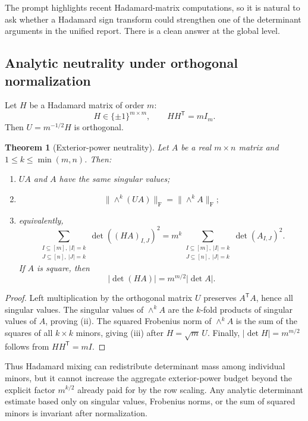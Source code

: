 \documentclass[11pt,oneside]{article}
\newtheorem{theorem}{Theorem}[section]
\theoremstyle{definition}
\theoremstyle{remark}
\begin{document}
The prompt highlights recent Hadamard-matrix computations, so it is natural to ask whether a
Hadamard sign transform could strengthen one of the determinant arguments in the unified
report.  There is a clean answer at the global level.

\subsection{Analytic neutrality under orthogonal normalization}

Let $H$ be a Hadamard matrix of order $m$:
\[
 H\in\{\pm1\}^{m\times m},\qquad HH^{\mathsf T}=mI_m.
\]
Then $U=m^{-1/2}H$ is orthogonal.

\begin{theorem}[Exterior-power neutrality]
\label{thm:hadamard-neutrality}
Let $A$ be a real $m\times n$ matrix and $1\le k\le\min(m,n)$.  Then:
\begin{enumerate}[label=\textup{(\roman*)}]
\item $UA$ and $A$ have the same singular values;
\item
\[
 \|\wedge^k(UA)\|_{\mathrm F}=\|\wedge^k A\|_{\mathrm F};
\]
\item equivalently,
\[
 \sum_{\substack{I\subseteq[m],\ |I|=k\\J\subseteq[n],\ |J|=k}}
 \det((HA)_{I,J})^2
 =m^k
 \sum_{\substack{I\subseteq[m],\ |I|=k\\J\subseteq[n],\ |J|=k}}
 \det(A_{I,J})^2.
\]
If $A$ is square, then
\[
 |\det(HA)|=m^{m/2}|\det A|.
\]
\end{enumerate}
\end{theorem}

\begin{proof}
Left multiplication by the orthogonal matrix $U$ preserves $A^{\mathsf T}A$, hence all
singular values.  The singular values of $\wedge^k A$ are the $k$-fold products of singular
values of $A$, proving (ii).  The squared Frobenius norm of $\wedge^k A$ is the sum of the
squares of all $k\times k$ minors, giving (iii) after $H=\sqrt m\,U$.  Finally,
$|\det H|=m^{m/2}$ follows from $HH^{\mathsf T}=mI$.
\end{proof}

Thus Hadamard mixing can redistribute determinant mass among individual minors, but it cannot
increase the aggregate exterior-power budget beyond the explicit factor $m^{k/2}$ already
paid for by the row scaling.  Any analytic determinant estimate based only on singular
values, Frobenius norms, or the sum of squared minors is invariant after normalization.
\end{document}
